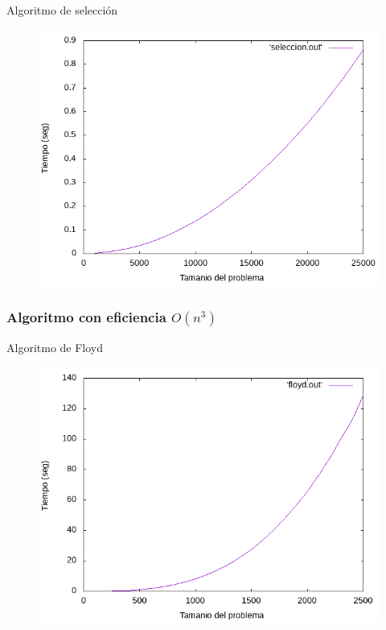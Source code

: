 \documentclass{beamer}
\begin{document}
\begin{frame}[fragile]{Algoritmo de selección}
\begin{figure}[H]
\centering
\includegraphics[scale=0.5]{empirica_seleccion.png}
\end{figure}
\end{frame}

\subsubsection{Algoritmo con eficiencia $O(n^3)$}
\begin{frame}[fragile]{Algoritmo de Floyd}
\begin{figure}[H]
\centering
\includegraphics[scale=0.5]{empirica_floyd.png}
\end{figure}
\end{frame}
\end{document}
